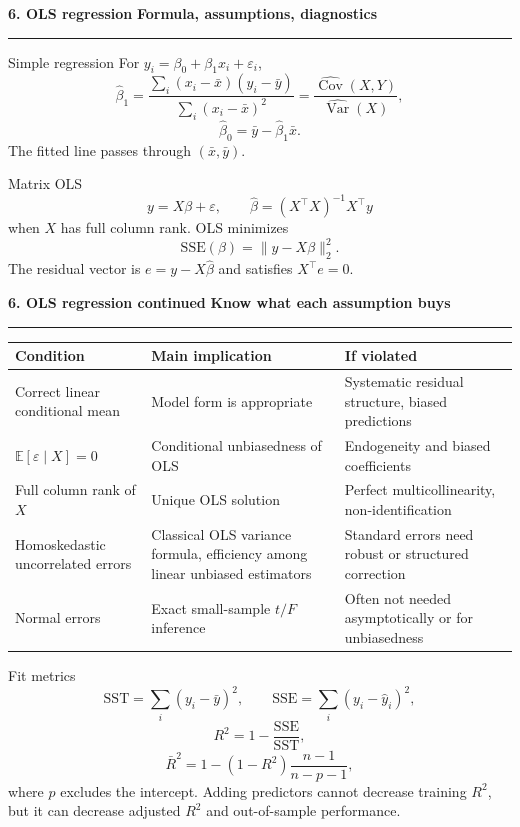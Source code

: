 \documentclass[10pt,a4paper]{article}
\newcommand{\sectionbanner}[2]{%
  \vspace{2mm}
  {\color{navy}\Large\bfseries #1}\hfill
  {\color{blue}\bfseries #2}
  \par\vspace{1mm}\color{line}\rule{\linewidth}{0.8pt}\color{ink}\vspace{2mm}
}
\newcommand{\E}{\mathbb{E}}
\newcommand{\Var}{\operatorname{Var}}
\newcommand{\Cov}{\operatorname{Cov}}
\begin{document}
\newpage
\sectionbanner{6. OLS regression}{Formula, assumptions, diagnostics}

\begin{formulabox}{Simple regression}
For $y_i=\beta_0+\beta_1x_i+\varepsilon_i$,
\[
\hat\beta_1=\frac{\sum_i(x_i-\bar x)(y_i-\bar y)}{\sum_i(x_i-\bar x)^2}
=\frac{\widehat{\Cov}(X,Y)}{\widehat{\Var}(X)},
\]
\[
\hat\beta_0=\bar y-\hat\beta_1\bar x.
\]
The fitted line passes through $(\bar x,\bar y)$.
\end{formulabox}

\begin{formulabox}{Matrix OLS}
\[
y=X\beta+\varepsilon,\qquad
\hat\beta=(X^\top X)^{-1}X^\top y
\]
when $X$ has full column rank. OLS minimizes
\[
\mathrm{SSE}(\beta)=\|y-X\beta\|_2^2.
\]
The residual vector is $e=y-X\hat\beta$ and satisfies $X^\top e=0$.
\end{formulabox}

\sectionbanner{6. OLS regression continued}{Know what each assumption buys}

\small
\begin{tabularx}{\linewidth}{@{}p{39mm}XX@{}}
\toprule
Condition & Main implication & If violated \\
\midrule
Correct linear conditional mean & Model form is appropriate & Systematic residual structure, biased predictions \\
$\E[\varepsilon\mid X]=0$ & Conditional unbiasedness of OLS & Endogeneity and biased coefficients \\
Full column rank of $X$ & Unique OLS solution & Perfect multicollinearity, non-identification \\
Homoskedastic uncorrelated errors & Classical OLS variance formula, efficiency among linear unbiased estimators & Standard errors need robust or structured correction \\
Normal errors & Exact small-sample $t/F$ inference & Often not needed asymptotically or for unbiasedness \\
\bottomrule
\end{tabularx}
\normalsize

\begin{formulabox}{Fit metrics}
\[
\mathrm{SST}=\sum_i(y_i-\bar y)^2,\qquad
\mathrm{SSE}=\sum_i(y_i-\hat y_i)^2,
\]
\[
R^2=1-\frac{\mathrm{SSE}}{\mathrm{SST}},
\]
\[
\bar R^2=1-(1-R^2)\frac{n-1}{n-p-1},
\]
where $p$ excludes the intercept. Adding predictors cannot decrease training $R^2$, but it can decrease adjusted $R^2$ and out-of-sample performance.
\end{formulabox}
\end{document}
